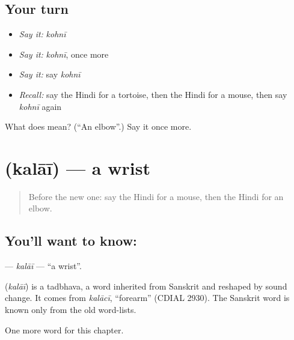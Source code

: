 \subsection*{Your turn}
\begin{itemize}
\raggedright
  \item \emph{Say it:} \emph{kohnī}
  \item \emph{Say it:} \emph{kohnī}, once more
  \item \emph{Say it:} say \emph{kohnī}
  \item \emph{Recall:} say the Hindi for a tortoise, then the Hindi for a mouse, then say \emph{kohnī} again
\end{itemize}

\begin{tcolorbox}[breakable,colback=teal!4,colframe=teal!35!black,title={Before you move on}]
What does  mean? (\textquotedblleft{}An elbow\textquotedblright{}.) Say it once more.
\end{tcolorbox}
\section[\texorpdfstring{\hi{कलाई} (kalāī)}{कलाई (kalāī)}]{ (kalāī) — a wrist}

\label{lesson:HI-C150-kalai}



\begin{quote}
Before the new one: say the Hindi for a mouse, then the Hindi for an elbow.
\end{quote}

\subsection*{You'll want to know: }
\textbf{} — \emph{kalāī} — \textquotedblleft{}a wrist\textquotedblright{}.

\begin{cousinweb}
\textbf{} (\emph{kalāī}) is a tadbhava, a word inherited from Sanskrit and reshaped by sound change. It comes from \emph{kalācī}, \textquotedblleft{}forearm\textquotedblright{} (CDIAL 2930). The Sanskrit word is known only from the old word-lists.
\end{cousinweb}

\begin{grammarlens}[title={What you've built}]
One more word for this chapter.
\end{grammarlens}

